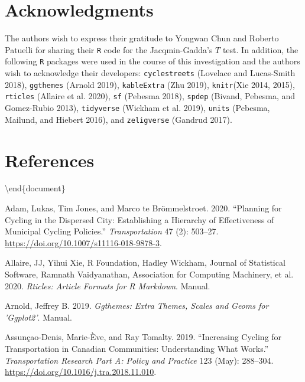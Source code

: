 \documentclass[smallextended]{svjour3}       %
\begin{document}
\hypertarget{sec:acknowledgments}{%
\section{Acknowledgments}\label{sec:acknowledgments}}

The authors wish to express their gratitude to Yongwan Chun and Roberto
Patuelli for sharing their \texttt{R} code for the Jacqmin-Gadda's \(T\)
test. In addition, the following \texttt{R} packages were used in the
course of this investigation and the authors wish to acknowledge their
developers: \texttt{cyclestreets} (Lovelace and Lucas-Smith 2018),
\texttt{ggthemes} (Arnold 2019), \texttt{kableExtra} (Zhu 2019),
\texttt{knitr}(Xie 2014, 2015), \texttt{rticles} (Allaire et al. 2020),
\texttt{sf} (Pebesma 2018), \texttt{spdep} (Bivand, Pebesma, and
Gomez-Rubio 2013), \texttt{tidyverse} (Wickham et al. 2019),
\texttt{units} (Pebesma, Mailund, and Hiebert 2016), and
\texttt{zeligverse} (Gandrud 2017).

\hypertarget{references}{%
\section*{References}\label{references}}

\textbackslash end\{document\}

\hypertarget{refs}{}
\leavevmode\hypertarget{ref-Adam2020}{}%
Adam, Lukas, Tim Jones, and Marco te Brömmelstroet. 2020. ``Planning for
Cycling in the Dispersed City: Establishing a Hierarchy of Effectiveness
of Municipal Cycling Policies.'' \emph{Transportation} 47 (2): 503--27.
\url{https://doi.org/10.1007/s11116-018-9878-3}.

\leavevmode\hypertarget{ref-Allaire2020}{}%
Allaire, JJ, Yihui Xie, R Foundation, Hadley Wickham, Journal of
Statistical Software, Ramnath Vaidyanathan, Association for Computing
Machinery, et al. 2020. \emph{Rticles: Article Formats for R Markdown}.
Manual.

\leavevmode\hypertarget{ref-Arnold2019}{}%
Arnold, Jeffrey B. 2019. \emph{Ggthemes: Extra Themes, Scales and Geoms
for 'Ggplot2'}. Manual.

\leavevmode\hypertarget{ref-Assuncao2019}{}%
Assunçao-Denis, Marie-Ève, and Ray Tomalty. 2019. ``Increasing Cycling
for Transportation in Canadian Communities: Understanding What Works.''
\emph{Transportation Research Part A: Policy and Practice} 123 (May):
288--304. \url{https://doi.org/10.1016/j.tra.2018.11.010}.
\end{document}
